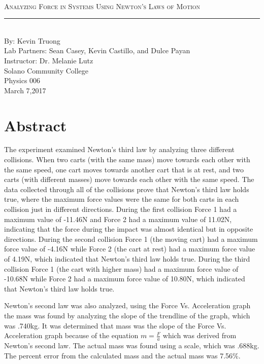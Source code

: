 \documentclass[aps,letterpaper,11pt]{revtex4}
\newcommand{\labno}{5}
\newcommand{\labtitle}{Analyzing Force in Systems Using Newton's Laws of Motion}
\newcommand{\authorname}{Kevin Truong}
\newcommand{\professor}{Dr. Melanie Lutz}
\newcommand{\classno}{Physics 006}
\newcommand{\labpartners}{Sean Casey, Kevin Castillo, and Dulce Payan}
\newcommand{\submitdate}{March 7,2017}
\begin{document}
\begin{titlepage}
\begin{center}
\hspace{-136mm}\boxed{{\Large \textsc{Lab No. \labno}}}\\\vspace{30mm}
{\Large \textsc{\labtitle} \\ \vspace{4pt}}
\rule[13pt]{\textwidth}{1pt}\\ \vspace{150pt}
{\large By: \authorname \\ \vspace{10pt}}
Lab Partners: \labpartners \\
Instructor: \professor \vspace{10pt} \\
Solano Community College\\ \classno \\ \vspace{10pt}
\submitdate
\end{center}
\end{titlepage}

\section{Abstract}

The experiment examined Newton's third law by analyzing three different collisions. When two carts (with the same mass) move towards each other with the same speed, one cart moves towards another cart that is at rest, and two carts (with different masses) move towards each other with the same speed. The data collected through all of the collisions prove that Newton's third law holds true, where the maximum force values were the same for both carts in each collision just in different directions. During the first collision Force 1 had a maximum value of -11.46N and Force 2 had a maximum value of 11.02N, indicating that the force during the impact was almost identical but in opposite directions. During the second collision Force 1 (the moving cart) had a maximum force value of -4.16N while Force 2 (the cart at rest) had a maximum force value of 4.19N, which indicated that Newton's third law holds true. During the third collision Force 1 (the cart with higher mass) had a maximum force value of -10.68N while Force 2 had a maximum force value of 10.80N, which indicated that Newton's third law holds true. 

Newton's second law was also analyzed, using the Force Vs. Acceleration graph the mass was found by analyzing the slope of the trendline of the graph, which was .740kg. It was determined that mass was the slope of the Force Vs. Acceleration graph because of the equation $m = \frac{F}{a}$ which was derived from Newton's second law. The actual mass was found using a scale, which was .688kg. The percent error from the calculated mass and the actual mass was 7.56\%.
\end{document}
